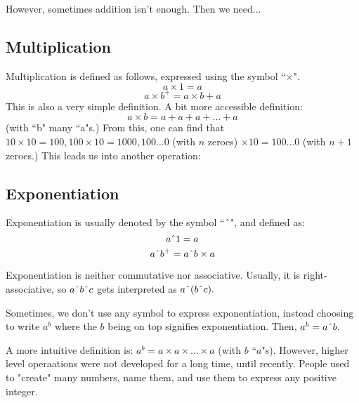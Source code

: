 However, sometimes addition isn't enough. Then we need...

\subsection{Multiplication}
Multiplication is defined as follows, expressed using the symbol ``$\times$".
	$$ a \times 1 = a $$
	$$ a \times b^+ = a \times b + a $$
This is also a very simple definition. A bit more accessible definition:
        $$ a \times b = a + a + a + \ldots + a $$ (with ``b" many ``a"s.)
From this, one can find that $10\times 10 = 100, 100\times 10=1000, 100\ldots0$ (with $n$ zeroes)
$\times 10 = 100\ldots0$ (with $n+1$ zeroes.) This leads us into another operation:

\subsection{Exponentiation}
Exponentiation is usually denoted by the symbol ``$\textrm{\^{}}$", and defined as:
	$$ a\textrm{\^{}} 1=a $$
	$$ a\textrm{\^{}} b^+ =a\textrm{\^{}}b \times a $$

Exponentiation is neither commutative nor associative. Usually, it is right-associative, so $ a\textrm{\^{}}b\textrm{\^{}}c $ 
gets interpreted as $ a\textrm{\^{}}(b\textrm{\^{}}c). $

Sometimes, we don't use any symbol to express exponentiation, instead choosing to write $a^b$ where the $b$ being on top signifies exponentiation.
Then, $a^b=a\textrm{\^{}}b.$

A more intuitive definition is: $a^b=a\times a\times\ldots\times a $ (with $b$ ``$a$"s). However, higher level operaations were not developed 
for a long time, until recently. People used to "create" many numbers, name them, and use them to express any positive integer.
